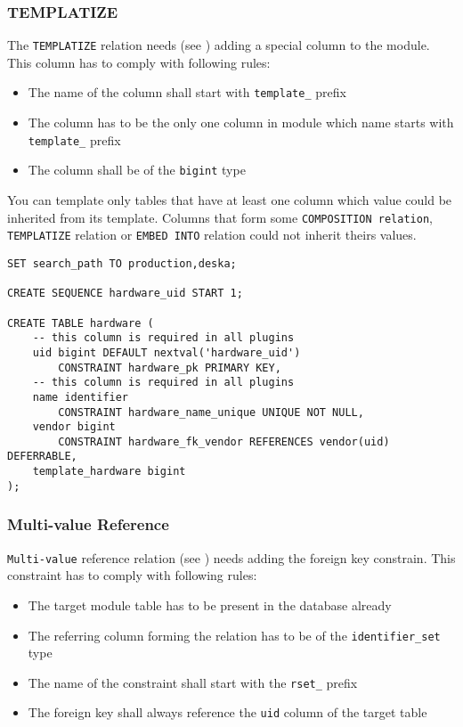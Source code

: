 \documentclass[deska]{subfiles}
\begin{document}
\subsubsection{TEMPLATIZE}
The {\tt TEMPLATIZE} relation needs (see ) adding a special column to the module. This column has to comply with following rules:
\begin{itemize}
    \item The name of the column shall start with {\tt template\_} prefix
    \item The column has to be the only one column in module which name starts with {\tt template\_} prefix
    \item The column shall be of the {\tt bigint} type
\end{itemize}
You can template only tables that have at least one column which value could be inherited from its template. Columns that form some {\tt COMPOSITION relation}, {\tt TEMPLATIZE} relation or {\tt EMBED INTO} relation could not inherit theirs values.

\begin{verbatim}
SET search_path TO production,deska;

CREATE SEQUENCE hardware_uid START 1;

CREATE TABLE hardware (
    -- this column is required in all plugins
    uid bigint DEFAULT nextval('hardware_uid')
        CONSTRAINT hardware_pk PRIMARY KEY,
    -- this column is required in all plugins
    name identifier
        CONSTRAINT hardware_name_unique UNIQUE NOT NULL,
    vendor bigint 
        CONSTRAINT hardware_fk_vendor REFERENCES vendor(uid) DEFERRABLE,
    template_hardware bigint
);
\end{verbatim}


\subsubsection{Multi-value Reference}
{\tt Multi-value} reference relation (see ) needs adding the foreign key constrain. This constraint has to comply with following rules:
\begin{itemize}
    \item The target module table has to be present in the database already
    \item The referring column forming the relation has to be of the {\tt identifier\_set} type
    \item The name of the constraint shall start with the {\tt rset\_} prefix
    \item The foreign key shall always reference the {\tt uid} column of the target table
\end{itemize}
\end{document}

